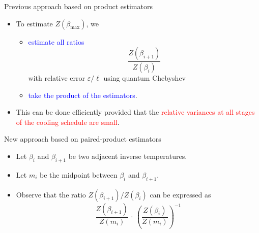 \documentclass{beamer}
\renewcommand{\>}{\rangle}
\newcommand{\<}{\langle}
\begin{document}
%

\begin{frame}{Previous approach based on product estimators}
    \begin{itemize}
        \item To estimate $Z(\beta_{\max})$, we
        
        \medskip
        \begin{itemize}
            \item \textcolor{blue}{estimate all ratios}
                \begin{equation*}
                    \frac{Z(\beta_{i+1})}{Z(\beta_{i})}
                \end{equation*} 
            with relative error $\varepsilon/\ell$ using quantum Chebyshev 
            
            \medskip
            \item \textcolor{blue}{take the product of the estimators}.
        \end{itemize}
        
        \bigskip
        \item This can be done efficiently provided that the \textcolor{red}{relative variances at all stages of the cooling schedule are small}.
    \end{itemize}
\end{frame}


%

\begin{frame}{New approach based on paired-product estimators}
    \begin{itemize}
        \item Let $\beta_i$ and $\beta_{i+1}$ be two adjacent inverse temperatures.
        
        \bigskip
        \item Let $m_i$ be the midpoint between $\beta_i$ and $\beta_{i+1}$.
        
        \bigskip
        \item Observe that the ratio $Z(\beta_{i+1}) / Z(\beta_i)$ 
        can be expressed as
        \begin{equation*}
            \frac{Z(\beta_{i+1})}{Z(m_i)}
            \, \cdot \,
            \left(
                \frac{Z(\beta_{i})}{Z(m_i)}
            \right)^{-1}
        \end{equation*}
    \end{itemize}
\end{frame}

%
\end{document}
